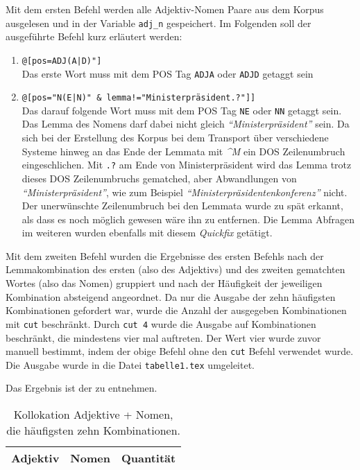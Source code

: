 \documentclass[%
	type=document,%
  	style=article,%
  	media=print,
  	pages=oneside,%
  	prefixLecturer=Dozenten:,
  	author=multiple,
]{unihildesheim} %
\begin{document}
Mit dem ersten Befehl werden alle Adjektiv-Nomen Paare aus dem Korpus ausgelesen
und in der Variable \texttt{adj\_n} gespeichert. Im Folgenden soll der
ausgeführte Befehl kurz erläutert werden:
\begin{enumerate}
  \item \texttt{@[pos=\dq ADJ(A|D)"]} \\
			Das erste Wort muss mit dem POS Tag \texttt{ADJA} oder \texttt{ADJD} getaggt
			sein
  \item \texttt{@[pos="N(E|N)" \& lemma!="Ministerpräsident.?"]]} \\
			Das darauf folgende Wort muss mit dem POS Tag \texttt{NE} oder \texttt{NN}
			getaggt sein. Das Lemma des Nomens darf dabei nicht gleich
			\textit{"`Ministerpräsident"'} sein. Da sich bei der Erstellung des Korpus bei dem
			Transport über verschiedene Systeme hinweg an das Ende der Lemmata mit
			\textit{\textasciicircum M} ein DOS Zeilenumbruch eingeschlichen. Mit
			\texttt{.?} am Ende von Ministerpräsident wird das Lemma trotz dieses DOS
			Zeilenumbruchs gematched, aber Abwandlungen von \textit{"`Ministerpräsident"'}, wie zum
			Beispiel \textit{"`Ministerpräsidentenkonferenz"'} nicht. Der unerwünschte
			Zeilenumbruch bei den Lemmata wurde zu spät erkannt, als dass es noch
			möglich gewesen wäre ihn zu entfernen. Die Lemma Abfragen im weiteren wurden
			ebenfalls mit diesem \textit{Quickfix} getätigt.
\end{enumerate}

Mit dem zweiten Befehl wurden die Ergebnisse des ersten Befehls nach der
Lemmakombination des ersten (also des Adjektivs) und des zweiten gematchten
Wortes (also das Nomen) gruppiert und nach der Häufigkeit der jeweiligen
Kombination absteigend angeordnet. Da nur die Ausgabe der zehn häufigsten
Kombinationen gefordert war, wurde die Anzahl der ausgegeben Kombinationen
mit \texttt{cut} beschränkt. Durch \texttt{cut 4} wurde die Ausgabe auf
Kombinationen beschränkt, die mindestens vier mal auftreten. Der Wert vier wurde zuvor manuell
bestimmt, indem der obige Befehl ohne den \texttt{cut} Befehl verwendet wurde.
Die Ausgabe wurde in die Datei \texttt{tabelle1.tex} umgeleitet.

Das Ergebnis ist der  zu entnehmen.

\begin{table}[htpb]\label{t}
	\center
	\begin{tabularx}{0.6\textwidth}{llr}
		\toprule
		\textbf{Adjektiv} & \textbf{Nomen} & \textbf{Quantität}\\
		\midrule
		
		\bottomrule
	\end{tabularx}
	\caption{Kollokation Adjektive + Nomen, die häufigsten zehn Kombinationen.}
	\label{tab:adjektive_nomina}
\end{table}
\end{document}
